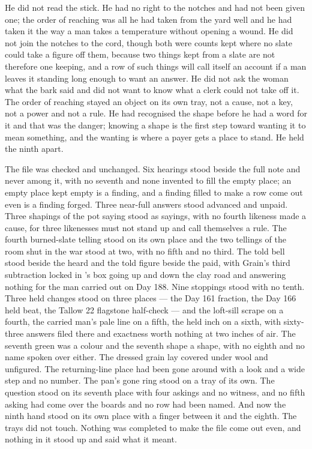 He did not read the stick. He had no right to the notches and had not been given one; the order of reaching was all he had taken from the yard well and he had taken it the way a man takes a temperature without opening a wound. He did not join the notches to the cord, though both were counts kept where no slate could take a figure off them, because two things kept from a slate are not therefore one keeping, and a row of such things will call itself an account if a man leaves it standing long enough to want an answer. He did not ask the woman what the bark said and did not want to know what a clerk could not take off it. The order of reaching stayed an object on its own tray, not a cause, not a key, not a power and not a rule. He had recognised the shape before he had a word for it and that was the danger; knowing a shape is the first step toward wanting it to mean something, and the wanting is where a payer gets a place to stand. He held the ninth apart.

The file was checked and unchanged. Six hearings stood beside the full note and never among it, with no seventh and none invented to fill the empty place; an empty place kept empty is a finding, and a finding filled to make a row come out even is a finding forged. Three near-full answers stood advanced and unpaid. Three shapings of the pot saying stood as sayings, with no fourth likeness made a cause, for three likenesses must not stand up and call themselves a rule. The fourth burned-slate telling stood on its own place and the two tellings of the room shut in the war stood at two, with no fifth and no third. The told bell stood beside the heard and the told figure beside the paid, with Grain's third subtraction locked in 's box going up and down the clay road and answering nothing for the man carried out on Day 188. Nine stoppings stood with no tenth. Three held changes stood on three places --- the Day 161 fraction, the Day 166 held beat, the Tallow 22 flagstone half-check --- and the loft-sill scrape on a fourth, the carried man's pale line on a fifth, the held inch on a sixth, with sixty-three answers filed there and exactness worth nothing at two inches of air. The seventh green was a colour and the seventh shape a shape, with no eighth and no name spoken over either. The dressed grain lay covered under wool and unfigured. The returning-line place had been gone around with a look and a wide step and no number. The pan's gone ring stood on a tray of its own. The question stood on its seventh place with four askings and no witness, and no fifth asking had come over the boards and no row had been named. And now the ninth hand stood on its own place with a finger between it and the eighth. The trays did not touch. Nothing was completed to make the file come out even, and nothing in it stood up and said what it meant.

